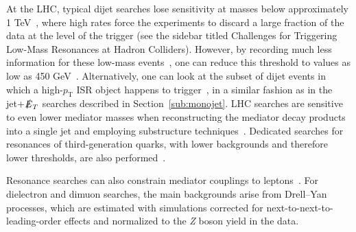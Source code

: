 \documentclass{ar-1col}
\newcommand{\gq}{$g_{\mathrm{q}}$\xspace}
\newcommand{\pt}{\ensuremath{p_\mathrm{T}}\xspace}
\newcommand{\MET}{\ensuremath{\slashed{E}_T}\xspace}
\begin{document}
{At the LHC, typical dijet searches lose sensitivity at masses
below approximately 1 TeV~\cite{An:2012ue,Dobrescu:2013coa}, where high
rates force the experiments to discard a large fraction of the
data at the level of the trigger (see the sidebar titled Challenges for Triggering Low-Mass Resonances at Hadron Colliders). 
However, by recording much less
information for these low-mass
events~\cite{Khachatryan:2016ecr,Aaboud:2016leb}, 
one can reduce this threshold to values as low as 450
GeV~\cite{Sirunyan:2018xlo,Aaboud:2018fzt}.  
Alternatively, one can look at the subset of dijet events in which a
high-\pt{} ISR object happens to
trigger~\cite{ATLAS:2016bvn,Sirunyan:2017nvi}, in a similar fashion as in
the jet+\MET searches described in Section~\ref{sub:monojet}. 
LHC searches are sensitive to even lower mediator masses when
reconstructing the mediator decay products into a single jet and
employing substructure techniques~\cite{Sirunyan:2017nvi,Aaboud:2018zba}. 
Dedicated searches for resonances of third-generation
quarks, with lower backgrounds and therefore lower thresholds, are
also performed~\cite{Aaboud:2018tqo,CMS-PAS-HIG-16-025,Aaboud:2017hnm}.

Resonance searches can also constrain mediator couplings to 
leptons~\cite{Aaboud:2017buh,Khachatryan:2016zqb}. For dielectron
and dimuon searches, the main backgrounds arise from Drell--Yan
processes, which are estimated with simulations corrected for next-to-next-to-leading-order
effects and normalized to the \textit{Z} boson yield in the data.


}
\end{document}
